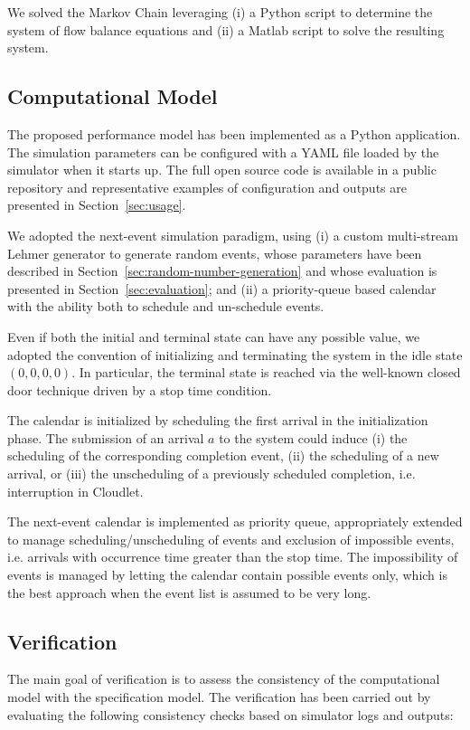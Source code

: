 We solved the Markov Chain leveraging (i) a Python script to determine the system of flow balance equations and (ii) a Matlab script to solve the resulting system.



\subsection{Computational Model}
The proposed performance model has been implemented as a Python application. 
The simulation parameters can be configured with a YAML file loaded by the simulator when it starts up.
The full open source code is available in a public repository \cite{gmarciani-pydes} and representative examples of configuration and outputs are presented in Section~\ref{sec:usage}.

We adopted the next-event simulation paradigm, using 
(i) a custom multi-stream Lehmer generator to generate random events, whose parameters have been described in Section~\ref{sec:random-number-generation} and whose evaluation is presented in Section~\ref{sec:evaluation}; and
(ii) a priority-queue based calendar with the ability both to schedule and un-schedule events.

Even if both the initial and terminal state can have any possible value, we adopted the convention of initializing and terminating the system in the idle state $(0,0,0,0)$. In particular, the terminal state is reached via the well-known closed door technique driven by a stop time condition.

The calendar is initialized by scheduling the first arrival in the initialization phase. The submission of an arrival $a$ to the system could induce
(i) the scheduling of the corresponding completion event,
(ii) the scheduling of a new arrival, or
(iii) the unscheduling of a previously scheduled completion, i.e. interruption in Cloudlet.

The next-event calendar is implemented as priority queue, appropriately extended to manage scheduling/unscheduling of events and exclusion of impossible events, i.e. arrivals with occurrence time greater than the stop time.
The impossibility of events is managed by letting the calendar contain possible events only, which is the best approach when the event list is assumed to be very long.


\subsection{Verification}
The main goal of verification is to assess the consistency of the computational model with the specification model.
The verification has been carried out by evaluating the following consistency checks based on simulator logs and outputs:


